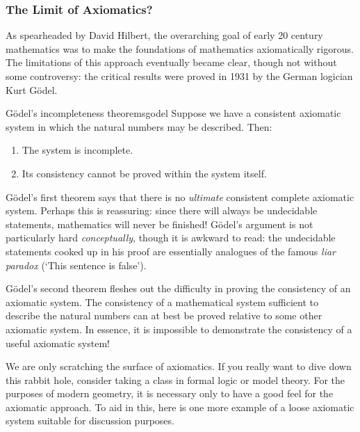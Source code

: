 \pagebreak[3]


\subsubsection*{The Limit of Axiomatics?}

As spearheaded by David Hilbert, the overarching goal of early 20\th{} century mathematics was to make the foundations of mathematics axiomatically rigorous. The limitations of this approach eventually became clear, though not without some controversy: the critical results were proved in 1931 by the German logician Kurt Gödel.


\begin{thm}{Gödel's incompleteness theorems}{godel}
	Suppose we have a consistent axiomatic system in which the natural numbers may be described. Then:
	\begin{enumerate}
	  \item The system is incomplete.
	  \item Its consistency cannot be proved within the system itself.
	\end{enumerate}
\end{thm}

Gödel's first theorem says that there is no \emph{ultimate} consistent complete axiomatic system. Perhaps this is reassuring: since there will always be undecidable statements, mathematics will never be finished! Gödel's argument is not particularly hard \emph{conceptually}, though it is awkward to read: the undecidable statements cooked up in his proof are essentially analogues of the famous \emph{liar paradox} (`This sentence is false').
\smallbreak

Gödel's second theorem fleshes out the difficulty in proving the consistency of an axiomatic system. The consistency of a mathematical system sufficient to describe the natural numbers can at best be proved relative to some other axiomatic system. In essence, it is impossible to demonstrate the consistency of a useful axiomatic system!\bigbreak

We are only scratching the surface of axiomatics. If you really want to dive down this rabbit hole, consider taking a class in formal logic or model theory. For the purposes of modern geometry, it is necessary only to have a good feel for the axiomatic approach. To aid in this, here is one more example of a loose axiomatic system suitable for discussion purposes.


